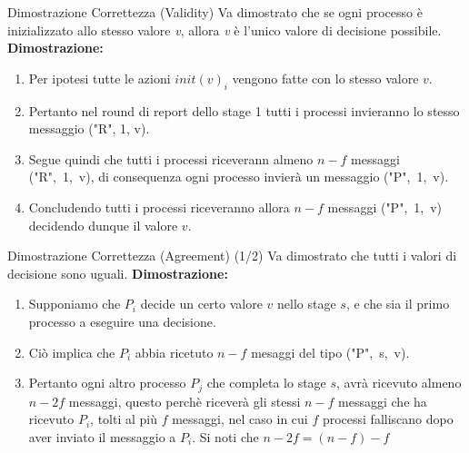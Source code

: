 \documentclass{beamer}
\begin{document}
\begin{frame}{Dimostrazione Correttezza (Validity)}
    Va dimostrato che se ogni processo è inizializzato allo stesso valore \textit{v}, allora \textit{v} è l'unico valore di decisione possibile.
    \newline \newline
    \textbf{Dimostrazione:}
    \begin{enumerate}
        \item<1-> Per ipotesi tutte le azioni $init(v)_{i}$ vengono fatte con lo stesso valore $v$.
        \item<2-> Pertanto nel round di report dello stage 1 tutti i processi invieranno lo stesso messaggio {("R", 1, v)}.
        \item<3-> Segue quindi che tutti i processi riceverann almeno $n - f$ messaggi \mbox{("R", 1, v)}, di consequenza ogni processo invierà un messaggio \mbox{("P", 1, v)}.
        \item<4-> Concludendo tutti i processi riceveranno allora $n - f$ messaggi \mbox{("P", 1, v)} decidendo dunque il valore $v$.
    \end{enumerate}
\end{frame}

\begin{frame}{Dimostrazione Correttezza (Agreement) (1/2)}
    Va dimostrato che tutti i valori di decisione sono uguali.\newline
    \textbf{Dimostrazione:}
    \begin{enumerate}
        \item<1-> Supponiamo che $P_{i}$ decide un certo valore $v$ nello stage $s$, e che sia il primo processo a eseguire una decisione.
        \item<2-> Ciò implica che $P_{i}$ abbia ricetuto $n - f$ mesaggi del tipo \mbox{("P", s, v)}.
        \item<3-> Pertanto ogni altro processo $P_{j}$ che completa lo stage $s$, avrà ricevuto almeno $n - 2f$
        messaggi, questo perchè riceverà gli stessi $n - f$ messaggi che ha ricevuto $P_{i}$, tolti al più $f$ messaggi, nel caso in cui $f$ processi falliscano dopo aver inviato il messaggio a $P_{i}$. Si noti che $n - 2f = (n - f) - f$
    \end{enumerate}
\end{frame}
\end{document}
